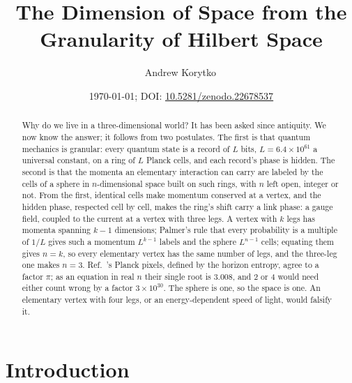 \documentclass[aps,prd,twocolumn,superscriptaddress,nofootinbib]{revtex4-2}
\begin{document}
\title{The Dimension of Space from the Granularity of Hilbert Space}

\author{Andrew Korytko\,}

\date{\today; DOI: \href{https://doi.org/10.5281/zenodo.22678537}{10.5281/zenodo.22678537}}

\begin{abstract}
Why do we live in a three-dimensional world? It has been asked since antiquity. We now know the answer; it follows from two postulates. The first is that quantum mechanics is granular: every quantum state is a record of $L$ bits, $L = 6.4\times10^{61}$ a universal constant, on a ring of $L$ Planck cells, and each record's phase is hidden. The second is that the momenta an elementary interaction can carry are labeled by the cells of a sphere in $n$-dimensional space built on such rings, with $n$ left open, integer or not. From the first, identical cells make momentum conserved at a vertex, and the hidden phase, respected cell by cell, makes the ring's shift carry a link phase: a gauge field, coupled to the current at a vertex with three legs. A vertex with $k$ legs has momenta spanning $k-1$ dimensions; Palmer's rule that every probability is a multiple of $1/L$ gives such a momentum $L^{k-1}$ labels and the sphere $L^{n-1}$ cells; equating them gives $n = k$, so every elementary vertex has the same number of legs, and the three-leg one makes $n = 3$. Ref.~\cite{korytko2026}'s Planck pixels, defined by the horizon entropy, agree to a factor $\pi$; as an equation in real $n$ their single root is $3.008$, and 2 or 4 would need either count wrong by a factor $3\times10^{30}$. The sphere is one, so the space is one. An elementary vertex with four legs, or an energy-dependent speed of light, would falsify it.
\end{abstract}


\maketitle

\section{Introduction}
\label{sec:intro}
\end{document}
